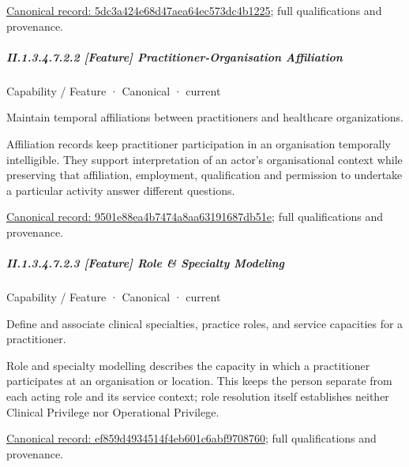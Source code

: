 {\footnotesize \href{../../../../continuum/strategy/capability/feature/5dc3a424e68d47aea64ec573dc4b1225.md}{Canonical record: 5dc3a424e68d47aea64ec573dc4b1225}; full qualifications and provenance.}\par
\subparagraph*{II.1.3.4.7.2.2 [Feature] Practitioner-Organisation Affiliation}
\label{navigation:II.1.3.4.7.2.2}

\label{element:9501e88ea4b7474a8aa63191687db51e}
{\small Capability / Feature · Canonical · current}\par

Maintain temporal affiliations between practitioners and healthcare organizations.



Affiliation records keep practitioner participation in an organisation temporally intelligible. They support interpretation of an actor's organisational context while preserving that affiliation, employment, qualification and permission to undertake a particular activity answer different questions.


{\footnotesize \href{../../../../continuum/strategy/capability/feature/9501e88ea4b7474a8aa63191687db51e.md}{Canonical record: 9501e88ea4b7474a8aa63191687db51e}; full qualifications and provenance.}\par
\subparagraph*{II.1.3.4.7.2.3 [Feature] Role \& Specialty Modeling}
\label{navigation:II.1.3.4.7.2.3}

\label{element:ef859d4934514f4eb601c6abf9708760}
{\small Capability / Feature · Canonical · current}\par

Define and associate clinical specialties, practice roles, and service capacities for a practitioner.



Role and specialty modelling describes the capacity in which a practitioner participates at an organisation or location. This keeps the person separate from each acting role and its service context; role resolution itself establishes neither Clinical Privilege nor Operational Privilege.


{\footnotesize \href{../../../../continuum/strategy/capability/feature/ef859d4934514f4eb601c6abf9708760.md}{Canonical record: ef859d4934514f4eb601c6abf9708760}; full qualifications and provenance.}\par
